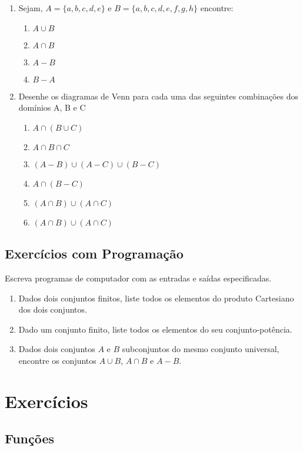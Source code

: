 \begin{enumerate}
	\item Sejam, $A = \{a, b, c, d, e\}$ e $B = \{a, b, c, d, e, f, g, h\}$ encontre:
	\begin{enumerate}
	  \item $A \cup B$ \item $A \cap B$ \item $A - B$ \item $B - A$ 
	\end{enumerate}
	
	\item Desenhe os diagramas de Venn para cada uma das seguintes combinações dos domínios A, B e C
	\begin{enumerate}
		\item $A \cap (B \cup C)$ \item $A \cap B \cap C$ \item $(A - B) \cup (A - C) \cup (B - C)$ 
		\item $A \cap (B - C)$ \item $(A \cap B) \cup (A \cap C)$ \item $(A \cap B) \cup (A \cap C)$
	\end{enumerate}
\end{enumerate}

\newpage
\section*{Exercícios com Programação}

Escreva programas de computador com as entradas e saídas especificadas.
\begin{enumerate}
  \item Dados dois conjuntos finitos, liste todos os elementos do produto
  Cartesiano dos dois conjuntos.
  \item Dado um conjunto finito, liste todos os elementos do seu
  conjunto-potência.
  \item Dados dois conjuntos $A$ e $B$ subconjuntos do mesmo conjunto universal,
  encontre os conjuntos $A \cup B$, $A \cap B$ e $A - B$.
\end{enumerate}

\chapter*{Exercícios}
\section*{Funções}

